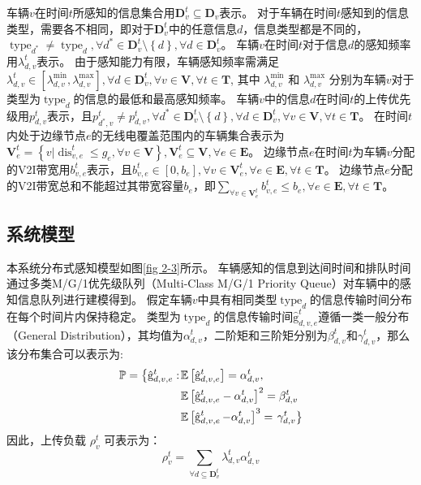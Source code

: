 车辆$v$在时间$t$所感知的信息集合用$\mathbf{D}_v^t\subseteq \mathbf{D}_v$表示。
对于车辆在时间$t$感知到的信息类型，需要各不相同，即对于$\mathbf{D}_v^t$中的任意信息$d$，信息类型都是不同的，$\operatorname{type}_{d^*} \neq \operatorname{type}_{d}, \forall d^* \in \mathbf{D}_v^t \setminus \left\{ d\right \}, \forall d \in \mathbf{D}_v^t$。
车辆$v$在时间$t$对于信息$d$的感知频率用$\lambda_{d,v}^t$表示。
由于感知能力有限，车辆感知频率需满足$\lambda_{d,v}^{t} \in [\lambda_{d,v}^{\min} , \lambda_{d,v}^{\max} ], \forall d \in \mathbf{D}_v^t, \forall v \in \mathbf{V}, \forall t \in \mathbf{T}$, 其中 $\lambda_{d,v}^{\min}$ 和 $\lambda_{d,v}^{\max}$ 分别为车辆$v$对于类型为$\operatorname{type}_{d}$的信息的最低和最高感知频率。
车辆$v$中的信息$d$在时间$t$的上传优先级用$p_{d,v}^t$表示，且${p}_{d^*, v}^t \neq {p}_{d, v}^t, \forall d^* \in \mathbf{D}_v^t \setminus \left\{ d\right \}, \forall d \in \mathbf{D}_v^t, \forall v \in \mathbf{V}, \forall t \in \mathbf{T}$。
在时间$t$内处于边缘节点$e$的无线电覆盖范围内的车辆集合表示为$\mathbf{V}_e^t=\left \{v \vert \operatorname{dis}_{v,e}^t \leq g_e, \forall v \in \mathbf{V} \right \}, \mathbf{V}_e^t \subseteq \mathbf{V}, \forall e \in \mathbf{E}$。
边缘节点$e$在时间$t$为车辆$v$分配的V2I带宽用$b_{v, e}^t$表示，且$b_{v, e}^t \in \left [0,b_e \right], \forall v \in \mathbf{V}_e^{t}, \forall e \in \mathbf{E}, \forall t \in \mathbf{T}$。
边缘节点$e$分配的V2I带宽总和不能超过其带宽容量$b_e$，即${\sum_{\forall v \in \mathbf{V}_e^{t}}b_{v, e}^t} \leq b_e, \forall e \in \mathbf{E}, \forall t \in \mathbf{T}$。

\subsection{系统模型}
本系统分布式感知模型如图\ref{fig 2-3}所示。
车辆感知的信息到达间时间和排队时间通过多类M/G/1优先级队列（Multi-Class M/G/1 Priority Queue）\cite{qian2020minimizing}对车辆中的感知信息队列进行建模得到。
假定车辆$v$中具有相同类型$\operatorname{type}_d$的信息传输时间分布在每个时间片内保持稳定。
类型为$\operatorname{type}_d$的信息传输时间$\operatorname{\hat{g}}_{d, v, e}^t$遵循一类一般分布（General Distribution），其均值为$\alpha_{d, v}^t$，二阶矩和三阶矩分别为$\beta_{d, v}^t$和$\gamma_{d, v}^t$，那么该分布集合可以表示为:
\begin{align}
	\mathbb{P}=\left\{\hat{\mathrm{g}}_{d, v, e}^t:\right. & \mathbb{E}\left[\hat{\mathrm{g}}_{d, v, e}^t\right]=\alpha_{d, v}^t, \notag \\
	& \mathbb{E}\left[\hat{\mathrm{g}}_{d, v, e}^t-\alpha_{d, v}^t\right]^2=\beta_{d, v}^t \notag \\
	& \mathbb{E}\left[\operatorname{\hat{g}}_{d, v, e}^t-\alpha_{d, v}^t\right]^{3}=\left.\gamma_{d, v}^t \right\}
\end{align}
因此，上传负载 $\rho_{v}^{t}$ 可表示为：
\begin{equation}
    \rho_{v}^{t}=\sum_{\forall d \subseteq \mathbf{D}_v^t} \lambda_{d,v}^{t}  \alpha_{d, v}^t
\end{equation}

